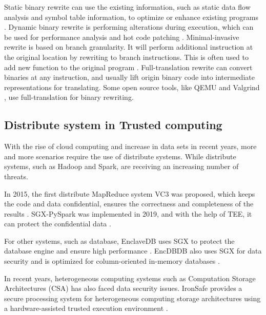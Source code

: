 Static binary rewrite can use the existing information, such as static data flow analysis and
symbol table information, to optimize or enhance existing programs \cite{10.1145/2629335, Schwarz2007PLTOAL}. 
Dynamic binary rewrite is performing alterations during execution, which can be used for performance
analysis \cite{Luk2005PinBC} and hot code patching \cite{Bruening2003AnIF}.
Minimal-invasive rewrite is based on branch granularity. It will perform additional instruction
at the original location by rewriting to branch instructions. This is often used to add new
function to the original program \cite{Federico2017revngAU}.
Full-translation rewrite can convert binaries at any instruction, and usually lift origin binary code
into intermediate representations for translating. Some open source tools,
like QEMU \cite{Bellard2005QEMUAF} and Valgrind \cite{Nethercote2007ValgrindAF},
use full-translation for binary rewriting.


\subsection{Distribute system in Trusted computing}
With the rise of cloud computing and increase in data sets in recent years,
more and more scenarios require the use of distribute systems.
While distribute systems, such as Hadoop and Spark, are receiving an increasing number of threats.

In 2015, the first distribute MapReduce system VC3 was proposed, which keeps the code and
data confidential, ensures the correctness and completeness of the results \cite{Schuster2015VC3TD}.
SGX-PySpark was implemented in 2019, and with the help of TEE, it can protect the confidential
data \cite{Quoc2019SGXPySparkSD}.

For other systems, such as database, EnclaveDB uses SGX to protect the database engine and ensure high performance \cite{Priebe2018EnclaveDBAS}. EncDBDB also uses SGX for data security and is optimized for column-oriented in-memory databases \cite{Fuhry2021EncDBDBSE}.

In recent years, heterogeneous computing systems such as Computation Storage Architectures (CSA) 
has also faced data security issues.
IronSafe provides a secure processing system for heterogeneous computing storage architectures using a hardware-assisted trusted execution environment \cite{Unnibhavi2022SecureAP}.